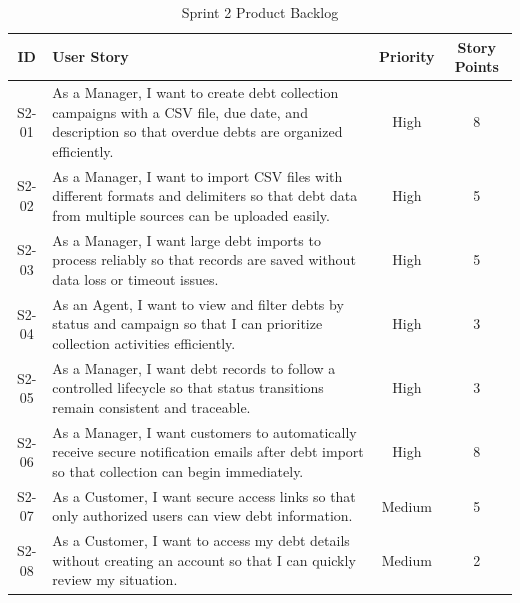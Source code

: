 \documentclass[12pt,a4paper]{report}
\begin{document}
\begin{table}[H]
  \centering
  \renewcommand{\arraystretch}{1.3}
  \begin{tabular}{|c|p{9cm}|c|c|}
    \hline
    \textbf{ID} & \textbf{User Story} & \textbf{Priority} & \textbf{Story Points} \\
    \hline

    S2-01 &
    As a Manager, I want to create debt collection campaigns with a CSV file, due date, and description so that overdue debts are organized efficiently.
    & High & 8 \\
    \hline

    S2-02 &
    As a Manager, I want to import CSV files with different formats and delimiters so that debt data from multiple sources can be uploaded easily.
    & High & 5 \\
    \hline

    S2-03 &
    As a Manager, I want large debt imports to process reliably so that records are saved without data loss or timeout issues.
    & High & 5 \\
    \hline

    S2-04 &
    As an Agent, I want to view and filter debts by status and campaign so that I can prioritize collection activities efficiently.
    & High & 3 \\
    \hline

    S2-05 &
    As a Manager, I want debt records to follow a controlled lifecycle so that status transitions remain consistent and traceable.
    & High & 3 \\
    \hline

    S2-06 &
    As a Manager, I want customers to automatically receive secure notification emails after debt import so that collection can begin immediately.
    & High & 8 \\
    \hline

    S2-07 &
    As a Customer, I want secure access links so that only authorized users can view debt information.
    & Medium & 5 \\
    \hline

    S2-08 &
    As a Customer, I want to access my debt details without creating an account so that I can quickly review my situation.
    & Medium & 2 \\
    \hline

  \end{tabular}
  \caption{Sprint 2 Product Backlog}
  \label{tab:sprint2-backlog}
\end{table}
\end{document}
